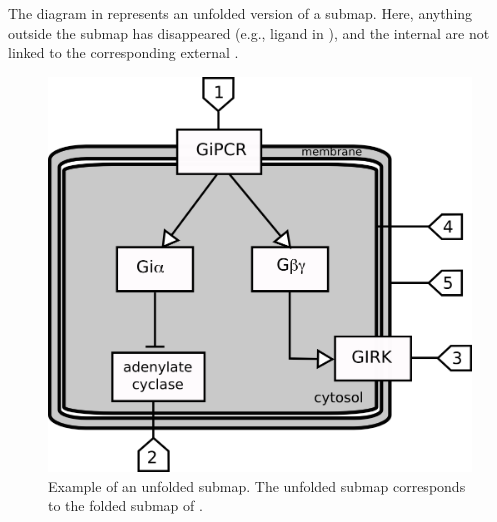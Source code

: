 The diagram in  represents an unfolded version of a submap.  Here, anything outside the submap has disappeared (e.g., ligand in ), and the internal  are not linked to the corresponding external .

\begin{figure}[H]
  \centering
  \includegraphics[scale = 0.5]{examples/submap-dissociated.png}
  \caption{Example of an unfolded submap. The unfolded submap corresponds to the folded submap of .}
  \label{fig:submap-unfolded}
\end{figure}
